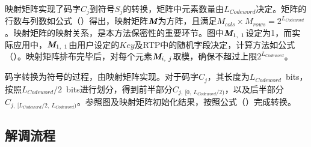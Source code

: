 映射矩阵实现了码字$C_{j}$到符号$S_{j}$的转换，矩阵中元素数量由$L_{Codeword}$决定。矩阵的行数与列数如公式（）得出，映射矩阵$\textit{\textbf{M}}$为方阵，且满足$M_{cols}\times M_{rows}=2^{L_{Codeword}}$。映射矩阵的映射关系，是本方法保密性的重要环节。图中$\textit{\textbf{M}}_{1,\ 1}$设定为1，而实际应用中，$\textit{\textbf{M}}_{1,\ 1}$由用户设定的$Key$及RTP中的随机字段决定，计算方法如公式（）。映射矩阵排布完毕后，对每个元素$\textit{\textbf{M}}_{i,\ j}$取模，确保不超过上限$2^{L_{Codeword}}$。

码字转换为符号的过程，由映射矩阵实现。对于码字$C_{j}$，其长度为$L_{Codeword}$\ bits，按照$L_{Codeword}/2$\ bits进行划分，得到前半部分$C_{j,\ [0,\ L_{Codeword}/2)}$，以及后半部分$C_{j,\ [L_{Codeword}/2,\ L_{Codeword})}$。参照图及映射矩阵初始化结果，按照公式（）完成转换。

\subsection{解调流程}
\label{chap:zigzag:model:demodulation}

